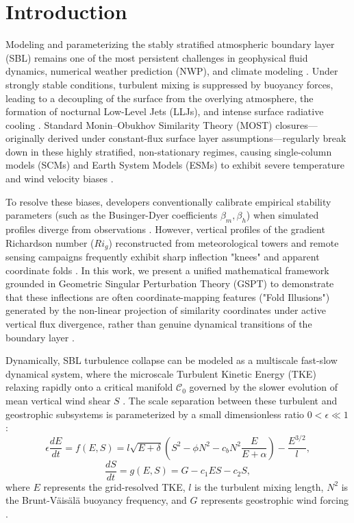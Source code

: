 \section{Introduction}
Modeling and parameterizing the stably stratified atmospheric boundary layer (SBL) remains one of the most persistent challenges in geophysical fluid dynamics, numerical weather prediction (NWP), and climate modeling \cite{gabls3_2013, sheba2002}. Under strongly stable conditions, turbulent mixing is suppressed by buoyancy forces, leading to a decoupling of the surface from the overlying atmosphere, the formation of nocturnal Low-Level Jets (LLJs), and intense surface radiative cooling \cite{cases99, grachev2007}. Standard Monin--Obukhov Similarity Theory (MOST) closures—originally derived under constant-flux surface layer assumptions—regularly break down in these highly stratified, non-stationary regimes, causing single-column models (SCMs) and Earth System Models (ESMs) to exhibit severe temperature and wind velocity biases \cite{cases99, gabls3_2013, businger1971}.

To resolve these biases, developers conventionally calibrate empirical stability parameters (such as the Businger-Dyer coefficients $\beta_m, \beta_h$) when simulated profiles diverge from observations \cite{gabls3_2013, businger1971, STABILITY}. However, vertical profiles of the gradient Richardson number ($Ri_g$) reconstructed from meteorological towers and remote sensing campaigns frequently exhibit sharp inflection "knees" and apparent coordinate folds \cite{cases99, BelowFastSlow}. In this work, we present a unified mathematical framework grounded in Geometric Singular Perturbation Theory (GSPT) to demonstrate that these inflections are often coordinate-mapping features ("Fold Illusions") generated by the non-linear projection of similarity coordinates under active vertical flux divergence, rather than genuine dynamical transitions of the boundary layer \cite{fenichel1979, CleanRestatement}.

Dynamically, SBL turbulence collapse can be modeled as a multiscale fast-slow dynamical system, where the microscale Turbulent Kinetic Energy (TKE) relaxing rapidly onto a critical manifold $\mathcal{C}_0$ governed by the slower evolution of mean vertical wind shear $S$ \cite{BelowFastSlow, CleanRestatement}. The scale separation between these turbulent and geostrophic subsystems is parameterized by a small dimensionless ratio $0 < \epsilon \ll 1$ \cite{BelowFastSlow}:
\begin{equation}
    \epsilon \frac{dE}{dt} = f(E, S) = l \sqrt{E+\delta} \left( S^2 - \phi N^2 - c_b N^2 \frac{E}{E+\alpha} \right) - \frac{E^{3/2}}{l}, \label{eq:fast_tke_intro}
\end{equation}
\begin{equation}
    \frac{dS}{dt} = g(E, S) = G - c_1 E S - c_2 S, \label{eq:slow_shear_intro}
\end{equation}
where $E$ represents the grid-resolved TKE, $l$ is the turbulent mixing length, $N^2$ is the Brunt-V\"ais\"al\"a buoyancy frequency, and $G$ represents geostrophic wind forcing \cite{BelowFastSlow, CoreMathRevisions}.

